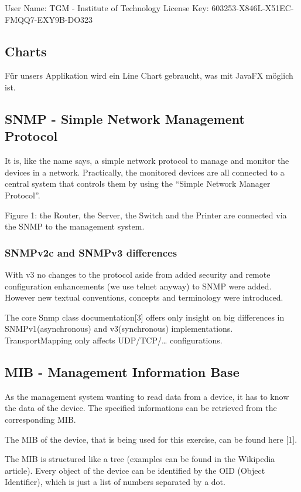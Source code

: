 \documentclass[11pt, a4paper]{article}
\begin{document}
User Name: TGM - Institute of Technology 
License Key: 603253-X846L-X51EC-FMQQ7-EXY9B-DO323

\subsection{Charts}
Für unsers Applikation wird ein Line Chart gebraucht, was mit JavaFX möglich ist. 

\subsection{SNMP - Simple Network Management Protocol}

It is, like the name says, a simple network protocol to manage and monitor the devices in a network. Practically, the monitored devices are all connected to a central system that controls them by using the “Simple Network Manager Protocol”.

Figure 1: the Router, the Server, the Switch and the Printer are connected via the SNMP to the management system.

\subsubsection{SNMPv2c and SNMPv3 differences}

With v3 no changes to the protocol aside from added security and remote configuration enhancements (we use telnet anyway) to SNMP were added. However new textual conventions, concepts and terminology were introduced.

The core Snmp class documentation[3] offers only insight on big differences in SNMPv1(asynchronous) and v3(synchronous) implementations. TransportMapping only affects UDP/TCP/… configurations.

\subsection{MIB - Management Information Base}
As the management system wanting to read data from a device, it has to know the data of the device. The specified informations can be retrieved from the corresponding MIB. 

The MIB of the device, that is being used for this exercise, can be found here [1].

The MIB is structured like a tree (examples can be found in the Wikipedia article). Every object of the device can be identified by the OID (Object Identifier), which is just a list of numbers separated by a dot.
\end{document}
